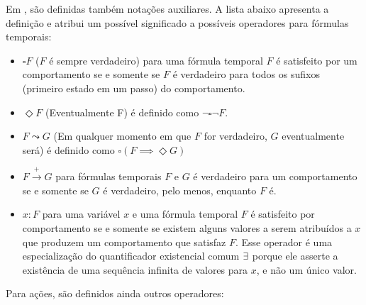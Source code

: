 Em \cite{tlaformalization}, são definidas também notações auxiliares. A lista abaixo apresenta a definição e atribui um possível significado a possíveis operadores para fórmulas temporais:
\begin{itemize}
  \item $\square F$ ($F$ é sempre verdadeiro) para uma fórmula temporal $F$ é satisfeito por um comportamento se e somente se $F$ é verdadeiro para todos os sufixos (primeiro estado em um passo) do comportamento.

  \item $\Diamond F$ (Eventualmente F) é definido como $\neg \square \neg F$.

  \item $F \leadsto G$ (Em qualquer momento em que $F$ for verdadeiro, $G$ eventualmente será) é definido como $\square(F \implies \Diamond G)$

  \item $F \stackrel{+}\rightarrow G$ para fórmulas temporais $F$ e $G$ é verdadeiro para um comportamento se e somente se $G$ é verdadeiro, pelo menos, enquanto $F$ é.

  \item \EE $x : F$ para uma variável $x$ e uma fórmula temporal $F$ é satisfeito por comportamento se e somente se existem alguns valores a serem atribuídos a $x$ que produzem um comportamento que satisfaz $F$. Esse operador é uma especialização do quantificador existencial comum $\exists$ porque ele asserte a existência de uma sequência infinita de valores para $x$, e não um único valor.

\end{itemize}

Para ações, são definidos ainda outros operadores:

